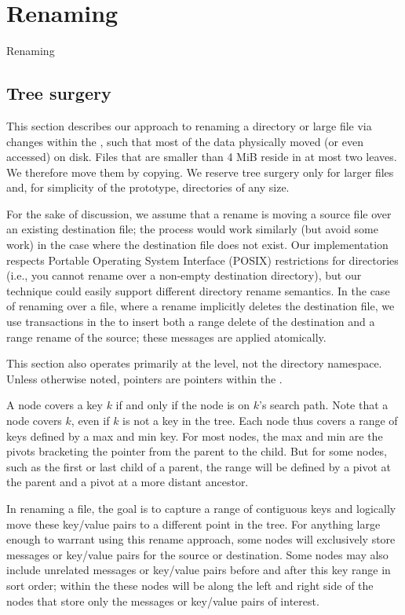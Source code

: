 \chapter{Renaming}
\label{chap:rename}

Renaming

\section{Tree surgery}

This section describes our approach to renaming a directory or large file via
changes within the \bet, such that most of the data physically moved (or even
accessed) on disk.
Files that are smaller than 4 MiB reside in at most two leaves.
We therefore move them by copying.
We reserve tree surgery only for larger files and, for simplicity of the
prototype, directories of any size.

For the sake of discussion, we assume that a rename is moving a source file over
an existing destination file;
the process would work similarly (but avoid some work) in the case where the
destination file does not exist.
Our implementation respects Portable Operating System Interface (POSIX)
restrictions for directories
(i.e., you cannot rename over a non-empty destination directory),
but our technique could easily support different directory rename semantics.
In the case of renaming over a file, where a rename implicitly deletes the
destination file, we use transactions in the \bet to insert both a range delete
of the destination and a range rename of the source;
these messages are applied atomically.

This section also operates primarily at the \bet level, not the directory
namespace.  Unless otherwise noted, pointers are pointers within the \bet.

A \bet node covers a key $k$ if and only if the node is on $k$'s search
path. Note that a node covers $k$, even if $k$ is not a key in the
tree.  Each \bet node thus covers a range of keys defined by a max
and min key.  For most nodes, the max and min are the
pivots bracketing the pointer from the parent to the child.  But for
some nodes, such as the first or last child of a parent, the range
will be defined by a pivot at the parent and a pivot at a more distant ancestor.

In renaming a file, the goal is to capture a range of contiguous keys and
logically move these key/value pairs to a different point in the tree.
For anything large enough to warrant using this rename approach,
some \bet nodes will exclusively store messages or key/value pairs
for the source or destination.
Some nodes may also include unrelated messages or key/value pairs
before and after this key range in sort order;
within the \bet these nodes will be along the left and right side of the nodes
that store only the messages or key/value pairs of interest.

